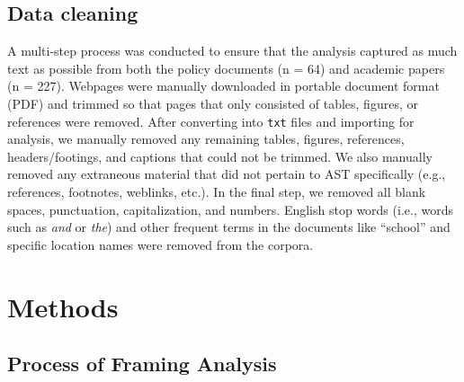 \documentclass[preprint, 3p,
authoryear]{elsarticle} %
\begin{document}
\hypertarget{data-cleaning}{%
\subsection{Data cleaning}\label{data-cleaning}}

A multi-step process was conducted to ensure that the analysis captured
as much text as possible from both the policy documents (n = 64) and
academic papers (n = 227). Webpages were manually downloaded in portable
document format (PDF) and trimmed so that pages that only consisted of
tables, figures, or references were removed. After converting into
\texttt{txt} files and importing for analysis, we manually removed any
remaining tables, figures, references, headers/footings, and captions
that could not be trimmed. We also manually removed any extraneous
material that did not pertain to AST specifically (e.g., references,
footnotes, weblinks, etc.). In the final step, we removed all blank
spaces, punctuation, capitalization, and numbers. English stop words
(i.e., words such as \emph{and} or \emph{the}) and other frequent terms
in the documents like ``school'' and specific location names were
removed from the corpora.

\hypertarget{methods}{%
\section{Methods}\label{methods}}

\hypertarget{process-of-framing-analysis}{%
\subsection{Process of Framing
Analysis}\label{process-of-framing-analysis}}
\end{document}
